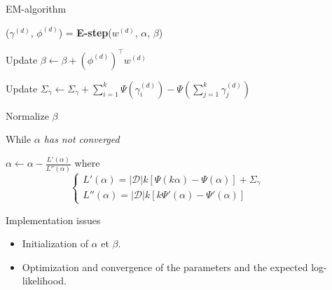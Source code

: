\documentclass[final]{beamer}
\newlength{\sepwid}
\newlength{\onecolwid}
\newlength{\twocolwid}
\begin{document}
\begin{frame}[t]
\begin{columns}[t]
\begin{column}{\twocolwid}
\begin{columns}[t,totalwidth=\twocolwid]
\begin{column}{\onecolwid}
\begin{block}{EM-algorithm}
{{\quad\quad ($\gamma^{(d)}$, $\phi^{(d)}$) = \textbf{E-step}($w^{(d)}$, $\alpha$, $\beta$)

\quad\quad Update $\beta \leftarrow \beta +  (\phi^{(d)})^{\top}w^{(d)}$

\quad\quad Update $\Sigma_{\gamma} \leftarrow \Sigma_{\gamma} + \sum_{i=1}^k \Psi (\gamma_i^{(d)}) - \Psi\left( \sum_{j=1}^k \gamma_j^{(d)}\right) $
}

\quad Normalize $\beta$ 

\quad While {\emph{$\alpha$ has not converged}}{

\quad \quad $\alpha \leftarrow \alpha - \frac{L'(\alpha)}{L''(\alpha)}$ where \[ \begin{cases}L'(\alpha) = |\mathcal{D}| k \left[ \Psi\left( k \alpha \right) - \Psi(\alpha)\right] + \Sigma_{\gamma} \\
L''(\alpha) = |\mathcal{D}|k [k\Psi'(\alpha) - \Psi' \left( \alpha\right)] \end{cases} \]

}
}
\end{block}

\begin{block}{Implementation issues}
\begin{itemize}
  \item Initialization of $\alpha$ et $\beta$.
  \item Optimization and convergence of the parameters and the expected log-likelihood.
\end{itemize}
\end{block}


\end{column} %

\end{columns} %

\end{column} %

\begin{column}{\sepwid}\end{column} %

\begin{column}{\onecolwid} %



\end{column}
\end{columns}
\end{frame}
\end{document}
